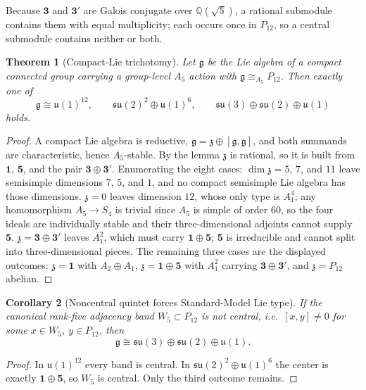 \documentclass[11pt]{article}
\newtheorem{theorem}{Theorem}[section]
\newtheorem{corollary}[theorem]{Corollary}
\begin{document}
Because \(\mathbf3\) and \(\mathbf3'\) are Galois conjugate over
\(\mathbb Q(\sqrt5)\), a rational submodule contains them with equal
multiplicity; each occurs once in \(P_{12}\), so a central submodule contains
neither or both.

\begin{theorem}[Compact-Lie trichotomy]
Let \(\mathfrak g\) be the Lie algebra of a compact connected group carrying a
group-level \(A_5\) action with \(\mathfrak g\cong_{A_5}P_{12}\). Then exactly
one of
\[
  \mathfrak g\cong
  \mathfrak u(1)^{12},
  \qquad
  \mathfrak{su}(2)^{2}\oplus\mathfrak u(1)^{6},
  \qquad
  \mathfrak{su}(3)\oplus\mathfrak{su}(2)\oplus\mathfrak u(1)
\]
holds.
\end{theorem}

\begin{proof}
A compact Lie algebra is reductive, \(\mathfrak g=\mathfrak z\oplus[\mathfrak
g,\mathfrak g]\), and both summands are characteristic, hence \(A_5\)-stable.
By the lemma \(\mathfrak z\) is rational, so it is built from \(\mathbf1\),
\(\mathbf5\), and the pair \(\mathbf3\oplus\mathbf3'\). Enumerating the eight
cases: \(\dim\mathfrak z=5\), \(7\), and \(11\) leave semisimple dimensions
\(7\), \(5\), and \(1\), and no compact semisimple Lie algebra has those
dimensions. \(\mathfrak z=0\) leaves dimension \(12\), whose only type is
\(A_1^4\); any homomorphism \(A_5\to S_4\) is trivial since \(A_5\) is simple
of order \(60\), so the four ideals are individually stable and their
three-dimensional adjoints cannot supply \(\mathbf5\). \(\mathfrak
z=\mathbf3\oplus\mathbf3'\) leaves \(A_1^2\), which must carry
\(\mathbf1\oplus\mathbf5\); \(\mathbf5\) is irreducible and cannot split into
three-dimensional pieces. The remaining three cases are the displayed
outcomes: \(\mathfrak z=\mathbf1\) with \(A_2\oplus A_1\), \(\mathfrak
z=\mathbf1\oplus\mathbf5\) with \(A_1^2\) carrying
\(\mathbf3\oplus\mathbf3'\), and \(\mathfrak z=P_{12}\) abelian.
\end{proof}

\begin{corollary}[Noncentral quintet forces Standard-Model Lie type]
If the canonical rank-five adjacency band \(W_5\subset P_{12}\) is not central,
i.e.\ \([x,y]\neq0\) for some \(x\in W_5\), \(y\in P_{12}\), then
\[
  \mathfrak g\cong\mathfrak{su}(3)\oplus\mathfrak{su}(2)\oplus\mathfrak u(1).
\]
\end{corollary}

\begin{proof}
In \(\mathfrak u(1)^{12}\) every band is central. In
\(\mathfrak{su}(2)^2\oplus\mathfrak u(1)^6\) the center is exactly
\(\mathbf1\oplus\mathbf5\), so \(W_5\) is central. Only the third outcome
remains.
\end{proof}
\end{document}
